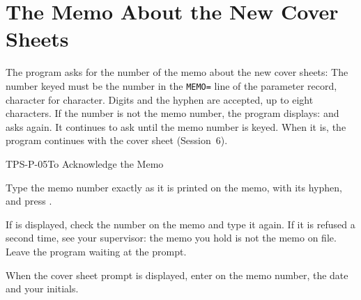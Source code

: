 \section{The Memo About the New Cover Sheets}
The program asks for the number of the memo about the new cover sheets:
The number keyed must be the number in the \texttt{MEMO=} line of the
parameter record, character for character.  Digits and the hyphen are
accepted, up to eight characters.  If the number is not the memo number, the
program displays:
and asks again.  It continues to ask until the memo number is keyed.  When it
is, the program continues with the cover sheet (Session~6).

\begin{Procedure}{TPS-P-05}{To Acknowledge the Memo}
\begin{ProcSteps}
\item Type the memo number exactly as it is printed on the memo, with its
  hyphen, and press .
\item If  is displayed, check the number on the memo
  and type it again.  If it is refused a second time, see your supervisor:
  the memo you hold is not the memo on file.  Leave the program waiting at
  the prompt.
\item When the cover sheet prompt is displayed, enter on  the memo
  number, the date and your initials.
\end{ProcSteps}
\end{Procedure}


\begin{CalloutLegend}
\end{CalloutLegend}

